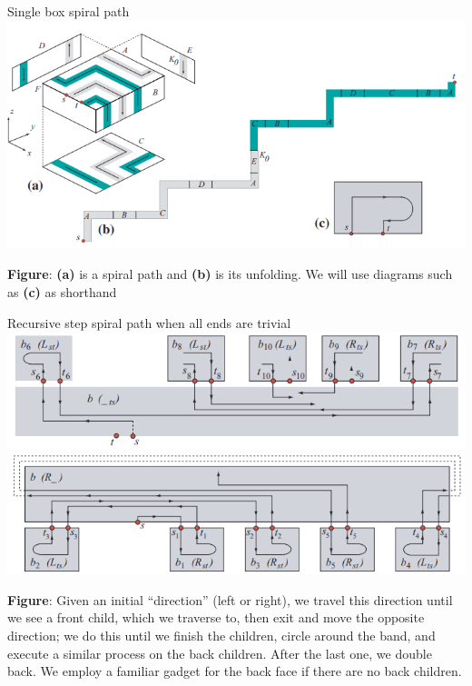 \documentclass[handout]{beamer}
\theoremstyle{plain}
\begin{document}
  \begin{frame}{Single box spiral path}
    \includegraphics[width=\textwidth]{./figs/New_diagram_who_dis.png}
    \begin{center}
      \footnotesize \textbf{Figure}: \textbf{(a)} is a spiral path and \textbf{(b)} is its unfolding.
    We will use diagrams such as \textbf{(c)} as shorthand 
    \end{center}
  \end{frame}

  \begin{frame}{Recursive step spiral path when all ends are trivial}
    \includegraphics[width=\textwidth]{./figs/Recursive_step_example_front.png}
    \includegraphics[width=\textwidth]{./figs/Recursive_step_example_back.png}
   
    \begin{center}
      \tiny
      \textbf{Figure}:
      Given an initial ``direction'' (left or right), we travel this direction until we see a front child, which we traverse to, then exit and move the opposite direction;
      we do this until we finish the children, circle around the band, and execute a similar process on the back children.
      After the last one, we double back.
      We employ a familiar gadget for the back face if there are no back children.
    \end{center}
  \end{frame}
\end{document}
